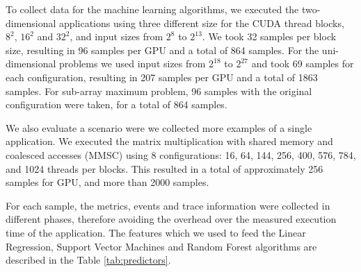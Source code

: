 To collect data for the machine learning algorithms, we executed the two-dimensional applications using three different size for the CUDA thread blocks, $8^2$, $16^2$ and $32^2$, and input sizes from $2^{8}$ to $2^{13}$. We took 32 samples per block size, resulting in 96 samples per GPU and a total of 864 samples. For the uni-dimensional problems we used input sizes from $2^{18}$ to $2^{27}$ and took 69 samples for each configuration, resulting in 207 samples per GPU and a total of 1863 samples. For sub-array maximum problem, 96 samples with the original configuration were taken, for a total of 864 samples. 

We also evaluate a scenario were we collected more examples of a single application. We executed the matrix multiplication with shared memory and coalesced accesses (MMSC) using 8 configurations: 16, 64, 144, 256, 400, 576, 784, and 1024 threads per blocks. This resulted in a total of approximately 256 samples for GPU, and more than 2000 samples.

For each sample, the metrics, events and trace information were collected in different phases, therefore avoiding the overhead over the measured execution time of the application. The features which we used to feed the Linear Regression, Support Vector Machines and Random Forest algorithms are described in the Table \ref{tab:predictors}.

